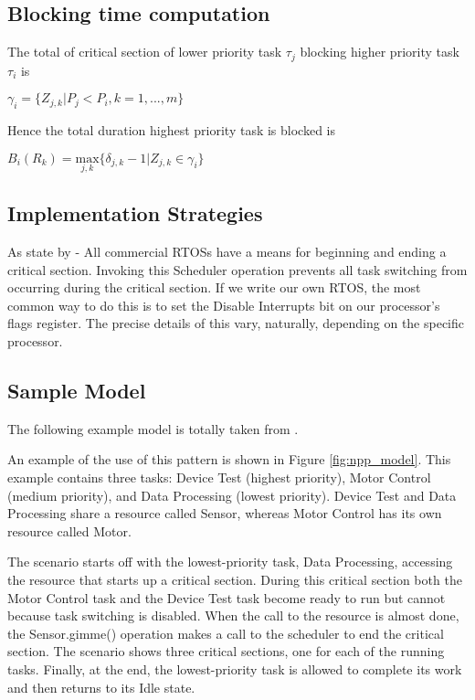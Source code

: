 \subsection{Blocking time computation}

	The total of critical section of lower priority task $\tau_{j}$ blocking higher priority task $\tau_{i}$ is

\begin{center}
$ \gamma_{i}=\{Z_{j,k} | P_{j}<P_{i}, k=1,...,m \} $ \cite{b5}
\end{center}

Hence the total duration highest priority task is blocked is

\begin{center}

$B_{i}(R_{k})=\underset{j,k}{\mathrm{max}} \{ \delta_{j,k}-1 | Z_{j,k} \in \gamma_{i}\}  $ \cite{b5}
\end{center}

\subsection{Implementation Strategies}

As state by \cite{b6} - All commercial RTOSs have a means for beginning and ending a critical section. Invoking this Scheduler 
operation prevents all task switching from occurring during the critical section. If we write our own RTOS, the most common way to do this is to set the Disable Interrupts bit on our processor's flags register. The precise details of this vary, naturally, depending on the specific processor.

\subsection{Sample Model}

The following example model is totally taken from \cite{b6}.

An example of the use of this pattern is shown in Figure \ref{fig:npp_model}. This example contains three tasks: Device Test (highest priority), Motor Control (medium priority), and Data Processing (lowest priority). Device Test and Data Processing share a resource called Sensor, whereas Motor Control has its own resource called Motor. 

The scenario starts off with the lowest-priority task, Data Processing, accessing the resource that starts up a critical section. During this critical section both the Motor Control task and the Device Test task become ready to run but cannot because task switching is disabled. When the call to the resource is almost done, the Sensor.gimme() operation makes a call to the scheduler to end the critical section. The scenario shows three critical sections, one for each of the running tasks. Finally, at the end, the lowest-priority task is allowed to complete its work and then returns to its Idle state.

